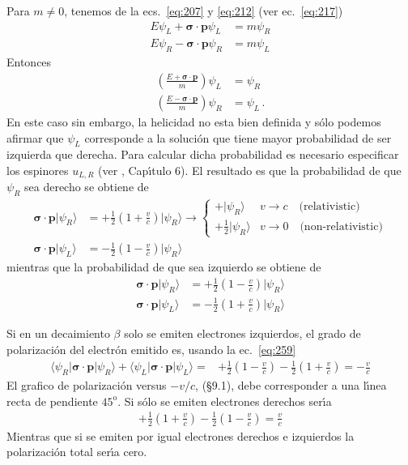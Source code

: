 Para $m\neq0$, tenemos de la ecs.~\eqref{eq:207} y \eqref{eq:212} (ver ec.~\eqref{eq:217})
\begin{align}
  E\psi_L+\boldsymbol{\sigma}\cdot\mathbf{p}\psi_L &=m\psi_R\nonumber\\
  E\psi_R-\boldsymbol{\sigma}\cdot\mathbf{p}\psi_R&=m\psi_L
\end{align}
Entonces
\begin{align}
  \label{eq:219}
  \left(\frac{E+\boldsymbol{\sigma}\cdot\mathbf{p}}{m}\right)\psi_L&=\psi_R\nonumber\\
  \left(\frac{E-\boldsymbol{\sigma}\cdot\mathbf{p}}{m}\right)\psi_R&=\psi_L\,.
\end{align}
En este caso sin embargo, la helicidad no esta bien definida y s\'olo podemos afirmar que $\psi_L$ corresponde a la soluci\'on que tiene mayor probabilidad de ser izquierda que derecha. Para calcular dicha probabilidad es necesario especificar los espinores $u_{L,R}$ (ver \cite{cottingham}, Cap\'\i tulo 6). El resultado es que la probabilidad de que $\psi_{R}$ sea derecho se obtiene de
\begin{align}
  \boldsymbol{\sigma}\cdot\mathbf{p}|\psi_{R}\rangle&=+\frac{1}{2}\left(1+\frac{v}{c}\right)|\psi_{R}\rangle\to 
  \begin{cases}
    +|\psi_{R}\rangle & v\to c\quad\text{(relativistic)}\\
    +\frac{1}{2}|\psi_{R}\rangle & v\to 0 \quad\text{(non-relativistic)}
  \end{cases}\nonumber\\
  \boldsymbol{\sigma}\cdot\mathbf{p}|\psi_{L}\rangle&=-\frac{1}{2}\left(1-\frac{v}{c}\right)|\psi_{R}\rangle
\end{align}
mientras que la probabilidad de que sea izquierdo se obtiene de
\begin{align}
\label{eq:259}
  \boldsymbol{\sigma}\cdot\mathbf{p}|\psi_{R}\rangle&=+\frac{1}{2}\left(1-\frac{v}{c}\right)|\psi_{R}\rangle\nonumber\\
  \boldsymbol{\sigma}\cdot\mathbf{p}|\psi_{L}\rangle&=-\frac{1}{2}\left(1+\frac{v}{c}\right)|\psi_{R}\rangle
\end{align}

Si en un decaimiento $\beta$ solo se emiten electrones izquierdos, el grado de polarizaci\'on del electr\'on emitido es, usando la ec.~\eqref{eq:259}
\begin{align}
   \langle \psi_R|\boldsymbol{\sigma}\cdot\mathbf{p}|\psi_R\rangle+ \langle \psi_L|\boldsymbol{\sigma}\cdot\mathbf{p}|\psi_L\rangle
=&+\frac{1}{2}\left(1-\frac{v}{c}\right)-\frac{1}{2}\left(1+\frac{v}{c}\right)=-\frac{v}{c}
\end{align}
El grafico de polarizaci\'on versus $-v/c$, \cite{cottingham} (\S9.1), debe corresponder a una l\'\i nea recta de pendiente $45^\text{o}$. Si s\'olo se emiten electrones derechos ser\'\i a
\begin{align}
  +\frac{1}{2}\left(1+\frac{v}{c}\right)-\frac{1}{2}\left(1-\frac{v}{c}\right)=\frac{v}{c}
\end{align}
Mientras que si se emiten por igual electrones derechos e izquierdos la polarizaci\'on total ser\'\i a cero.

